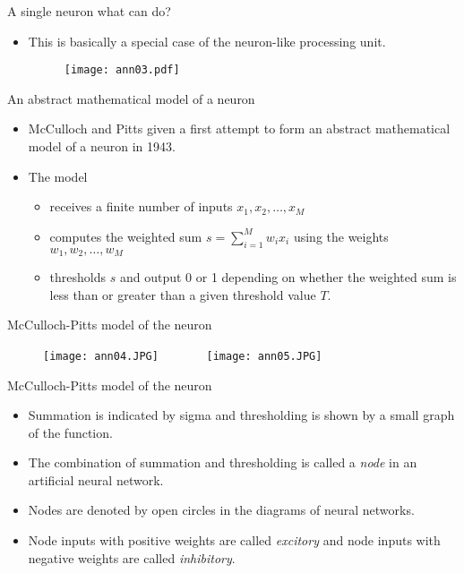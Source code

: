 \begin{frame}{A single neuron what can do?}
\begin{itemize}
\item This is basically a special case of the neuron-like processing unit.
\begin{figure}
\texttt{[image: ann03.pdf]}
\end{figure}
\end{itemize}
\end{frame}

\begin{frame}{An abstract mathematical model of a neuron}
\begin{itemize}
\item McCulloch and Pitts given a first attempt to form an abstract mathematical model of a neuron in 1943.
\item The model 
\begin{itemize}
\setlength{\itemsep}{5pt}
\item receives a finite number of inputs $x_1,x_2,\ldots,x_M$
\item computes the weighted sum $s = \sum\nolimits_{i = 1}^M {{w_i}{x_i}}$ using the weights $w_1,w_2,\ldots,w_M$
\item thresholds $s$ and output 0 or 1 depending on whether the weighted sum is less than or greater than a given threshold value $T$.
\end{itemize}
\end{itemize}
\end{frame}

\begin{frame}{McCulloch-Pitts model of the neuron}
\begin{figure}
\texttt{[image: ann04.JPG]}~~~~~~~
\texttt{[image: ann05.JPG]}
\end{figure}
\end{frame}


\begin{frame}{McCulloch-Pitts model of the neuron}
\begin{itemize}
\item Summation is indicated by sigma and thresholding is shown by a small graph of the function.
\item The combination of summation and thresholding is called a \textit{\color{slidecolor}node} in an artificial neural network.
\item Nodes are denoted by open circles in the diagrams of neural networks.
\item Node inputs with positive weights are called \textit{\color{slidecolor}excitory} and node inputs with negative weights are called \textit{\color{slidecolor}inhibitory}.
\end{itemize}
\end{frame}


